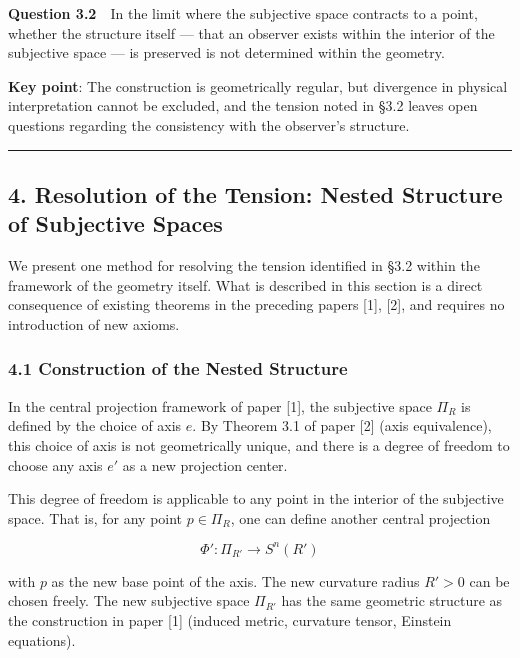 \documentclass[a4paper,11pt]{article}
\theoremstyle{definition}
\begin{document}
\textbf{Question 3.2}　In the limit where the subjective space contracts to a point, whether the structure itself --- that an observer exists within the interior of the subjective space --- is preserved is not determined within the geometry.

\textbf{Key point}: The construction is geometrically regular, but divergence in physical interpretation cannot be excluded, and the tension noted in §3.2 leaves open questions regarding the consistency with the observer's structure.

\begin{center}\rule{0.5\linewidth}{0.5pt}\end{center}

\subsection{4. Resolution of the Tension: Nested Structure of Subjective Spaces}\label{resolution-of-the-tension-nested-structure-of-subjective-spaces}

We present one method for resolving the tension identified in §3.2 within the framework of the geometry itself. What is described in this section is a direct consequence of existing theorems in the preceding papers {[}1{]}, {[}2{]}, and requires no introduction of new axioms.

\subsubsection{4.1 Construction of the Nested Structure}\label{construction-of-the-nested-structure}

In the central projection framework of paper {[}1{]}, the subjective space \(\Pi_R\) is defined by the choice of axis \(e\). By Theorem 3.1 of paper {[}2{]} (axis equivalence), this choice of axis is not geometrically unique, and there is a degree of freedom to choose any axis \(e'\) as a new projection center.

This degree of freedom is applicable to any point in the interior of the subjective space. That is, for any point \(p \in \Pi_R\), one can define another central projection

\[
\Phi' : \Pi_{R'} \longrightarrow S^n(R')
\]

with \(p\) as the new base point of the axis. The new curvature radius \(R' > 0\) can be chosen freely. The new subjective space \(\Pi_{R'}\) has the same geometric structure as the construction in paper {[}1{]} (induced metric, curvature tensor, Einstein equations).
\end{document}
